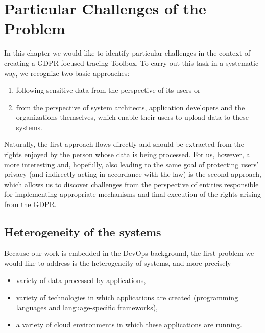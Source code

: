 \section{Particular Challenges of the Problem}
In this chapter we would like to identify particular challenges in the context of creating a GDPR-focused tracing Toolbox. To carry out this task in a systematic way, we recognize two basic approaches: 

\begin{enumerate}
    \item following sensitive data from the perspective of its users or
    \item  from the perspective of system architects, application developers and the organizations themselves, which enable their users to upload data to these systems.
\end{enumerate}

Naturally, the first approach flows directly and should be extracted from the rights enjoyed by the person whose data is being processed. For us, however, a more interesting and, hopefully, also leading to the same goal of protecting users' privacy (and indirectly acting in accordance with the law) is the second approach, which allows us to discover challenges from the perspective of entities responsible for implementing appropriate mechanisms and final execution of the rights arising from the GDPR.

\subsection{Heterogeneity of the systems}
Because our work is embedded in the DevOps background, the first problem we would like to address is the heterogeneity of systems, and more precisely

\begin{itemize}
    \item variety of data processed by applications,
    \item variety of technologies in which applications are created (programming languages and language-specific frameworks),
    \item a variety of cloud environments in which these applications are running.
\end{itemize}


